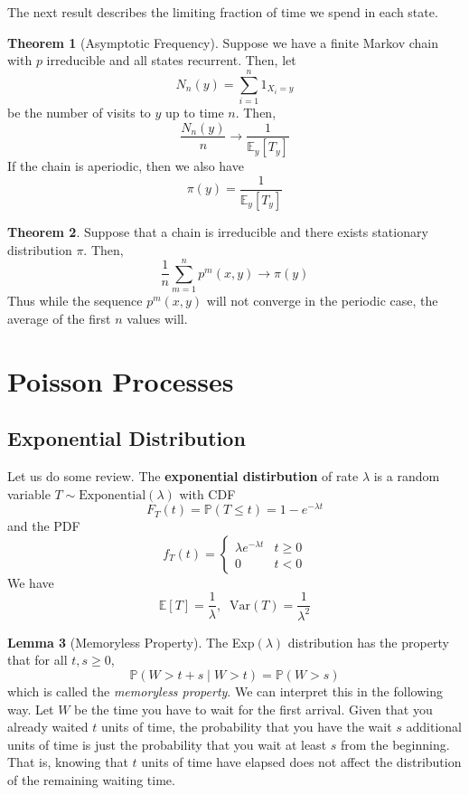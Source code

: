 \documentclass{article}
\theoremstyle{definition}
\newtheorem{theorem}{Theorem}[section]
\newtheorem{lemma}[theorem]{Lemma}
\theoremstyle{remark}
\theoremstyle{definition}
\begin{document}
The next result describes the limiting fraction of time we spend in each state. 

\begin{theorem}[Asymptotic Frequency]
Suppose we have a finite Markov chain with $p$ irreducible and all states recurrent. Then, let 
\[N_n (y) = \sum_{i=1}^n 1_{X_i = y}\]
be the number of visits to $y$ up to time $n$. Then, 
\[\frac{N_n (y)}{n} \rightarrow \frac{1}{\mathbb{E}_y [T_y]}\]
If the chain is aperiodic, then we also have 
\[\pi(y) = \frac{1}{\mathbb{E}_y [T_y]}\]
\end{theorem}

\begin{theorem}
Suppose that a chain is irreducible and there exists stationary distribution $\pi$. Then, 
\[\frac{1}{n} \sum_{m=1}^n p^m (x, y) \rightarrow \pi(y)\]
Thus while the sequence $p^m (x, y)$ will not converge in the periodic case, the average of the first $n$ values will. 
\end{theorem}


\section{Poisson Processes}

\subsection{Exponential Distribution}

Let us do some review. The \textbf{exponential distirbution} of rate $\lambda$ is a random variable $T \sim \mathrm{Exponential}(\lambda)$ with CDF 
\[F_T (t) = \mathbb{P}(T \leq t) = 1 - e^{-\lambda t}\]
and the PDF 
\[f_T (t) = \begin{cases} \lambda e^{-\lambda t} & t \geq 0 \\ 0 & t < 0 \end{cases}\]
We have 
\[\mathbb{E}[T] = \frac{1}{\lambda}, \;\; \mathrm{Var}(T) = \frac{1}{\lambda^2}\]

\begin{lemma}[Memoryless Property]
The Exp$(\lambda)$ distribution has the property that for all $t, s \geq 0$, 
\[\mathbb{P}(W > t + s \; | \; W > t) = \mathbb{P}(W > s)\]
which is called the \textit{memoryless property}. We can interpret this in the following way. Let $W$ be the time you have to wait for the first arrival. Given that you already waited $t$ units of time, the probability that you have the wait $s$ additional units of time is just the probability that you wait at least $s$ from the beginning. That is, knowing that $t$ units of time have elapsed does not affect the distribution of the remaining waiting time. 
\end{lemma}
\end{document}

